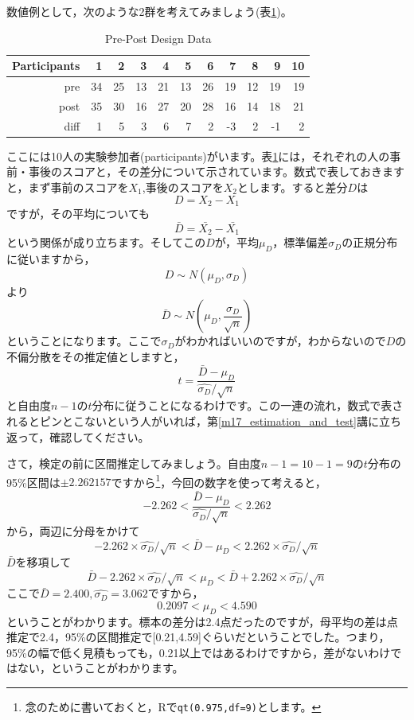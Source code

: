 \documentclass{ltjsbook}
\begin{document}
数値例として，次のような2群を考えてみましょう(表\ref{tbl19::01})。
\begin{table}[ht]
	\centering
	\caption{Pre-Post Design Data}
	\begin{tabular}{rrrrrrrrrrr}
		\hline
		Participants & 1  & 2  & 3  & 4  & 5  & 6  & 7  & 8  & 9  & 10 \\
		\hline
		pre          & 34 & 25 & 13 & 21 & 13 & 26 & 19 & 12 & 19 & 19 \\
		post         & 35 & 30 & 16 & 27 & 20 & 28 & 16 & 14 & 18 & 21 \\ \hline
		diff         & 1  & 5  & 3  & 6  & 7  & 2  & -3 & 2  & -1 & 2  \\
		\hline
	\end{tabular}
	\label{tbl19::01}
\end{table}
ここには10人の実験参加者(participants)がいます。表\ref{tbl19::01}には，それぞれの人の事前・事後のスコアと，その差分について示されています。数式で表しておきますと，まず事前のスコアを$X_1$,事後のスコアを$X_2$とします。すると差分$D$は
\[ D = X_2 - X_1 \]
ですが，その平均についても
\[ \bar{D} = \bar{X_2} - \bar{X_1} \]
という関係が成り立ちます。そしてこの$D$が，平均$\mu_D$，標準偏差$\sigma_D$の正規分布に従いますから，
\[ D \sim N(\mu_D,\sigma_D)\]
より
\[ \bar{D} \sim N(\mu_D,\frac{\sigma_D}{\sqrt{n}}) \]
ということになります。ここで$\sigma_D$がわかればいいのですが，わからないので$D$の不偏分散をその推定値としますと，
\[ t = \frac{\bar{D}-\mu_D}{\hat{\sigma_D}/\sqrt{n}} \]
と自由度$n-1$の$t$分布に従うことになるわけです。この一連の流れ，数式で表されるとピンとこないという人がいれば，第\ref{m17_estimation_and_test}講に立ち返って，確認してください。

さて，検定の前に区間推定してみましょう。自由度$n-1=10-1=9$の$t$分布の95\%区間は$\pm 2.262157$ですから\footnote{念のために書いておくと，Rで\texttt{qt(0.975,df=9)}とします。}，今回の数字を使って考えると，
\[ -2.262 < \frac{\bar{D}-\mu_D}{\hat{\sigma_D}/\sqrt{n}} < 2.262 \]
から，両辺に分母をかけて
\[ -2.262 \times \hat{\sigma_D}/\sqrt{n} < \bar{D}-\mu_D < 2.262 \times \hat{\sigma_D}/\sqrt{n} \]
$\bar{D}$を移項して
\[ \bar{D}-2.262 \times \hat{\sigma_D}/\sqrt{n} < \mu_D < \bar{D}+2.262\times \hat{\sigma_D}/\sqrt{n} \]
ここで$\bar{D} = 2.400,\hat{\sigma_D} = 3.062$ですから，
\[ 0.2097 < \mu_D < 4.590 \]
ということがわかります。標本の差分は2.4点だったのですが，母平均の差は点推定で2.4，95\%の区間推定で[0.21,4.59]ぐらいだということでした。つまり，95\%の幅で低く見積もっても，0.21以上ではあるわけですから，差がないわけではない，ということがわかります。
\end{document}
